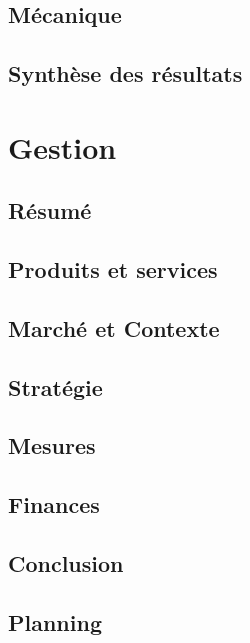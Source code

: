 \documentclass[11pt,titlepage]{report}
\begin{document}
\chapter{Mécanique}


\chapter{Synthèse des résultats}


\part{Gestion}

\chapter{Résumé}


\chapter{Produits et services}


\chapter{Marché et Contexte}


\chapter{Stratégie}


\chapter{Mesures}


\chapter{Finances}


\chapter{Conclusion}


\appendix

\chapter{Planning}
\label{app:planning}
\end{document}
